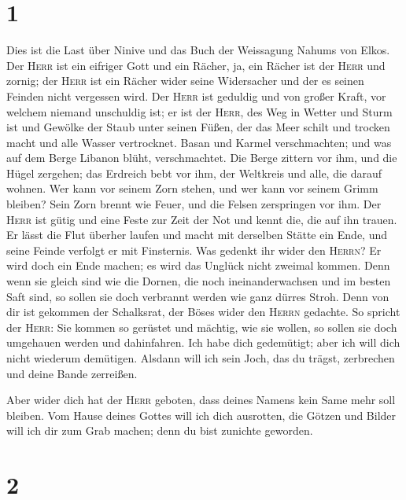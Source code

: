 \hypertarget{section}{%
\section{1}\label{section}}

 Dies ist die Last über Ninive und das Buch der Weissagung
Nahums von Elkos.  Der \textsc{Herr} ist ein eifriger Gott
und ein Rächer, ja, ein Rächer ist der \textsc{Herr} und zornig; der
\textsc{Herr} ist ein Rächer wider seine Widersacher und der es seinen
Feinden nicht vergessen wird.  Der \textsc{Herr} ist
geduldig und von großer Kraft, vor welchem niemand unschuldig ist; er
ist der \textsc{Herr}, des Weg in Wetter und Sturm ist und Gewölke der
Staub unter seinen Füßen,  der das Meer schilt und trocken
macht und alle Wasser vertrocknet. Basan und Karmel verschmachten; und
was auf dem Berge Libanon blüht, verschmachtet.  Die Berge
zittern vor ihm, und die Hügel zergehen; das Erdreich bebt vor ihm, der
Weltkreis und alle, die darauf wohnen.  Wer kann vor
seinem Zorn stehen, und wer kann vor seinem Grimm bleiben? Sein Zorn
brennt wie Feuer, und die Felsen zerspringen vor ihm.  Der
\textsc{Herr} ist gütig und eine Feste zur Zeit der Not und kennt die,
die auf ihn trauen.  Er lässt die Flut überher laufen und
macht mit derselben Stätte ein Ende, und seine Feinde verfolgt er mit
Finsternis.  Was gedenkt ihr wider den \textsc{Herrn}? Er
wird doch ein Ende machen; es wird das Unglück nicht zweimal kommen.
 Denn wenn sie gleich sind wie die Dornen, die noch
ineinanderwachsen und im besten Saft sind, so sollen sie doch verbrannt
werden wie ganz dürres Stroh.  Denn von dir ist gekommen
der Schalksrat, der Böses wider den \textsc{Herrn} gedachte.
 So spricht der \textsc{Herr}: Sie kommen so gerüstet und
mächtig, wie sie wollen, so sollen sie doch umgehauen werden und
dahinfahren. Ich habe dich gedemütigt; aber ich will dich nicht wiederum
demütigen.  Alsdann will ich sein Joch, das du trägst,
zerbrechen und deine Bande zerreißen.

 Aber wider dich hat der \textsc{Herr} geboten, dass
deines Namens kein Same mehr soll bleiben. Vom Hause deines Gottes will
ich dich ausrotten, die Götzen und Bilder will ich dir zum Grab machen;
denn du bist zunichte geworden.

\hypertarget{section-1}{%
\section{2}\label{section-1}}

